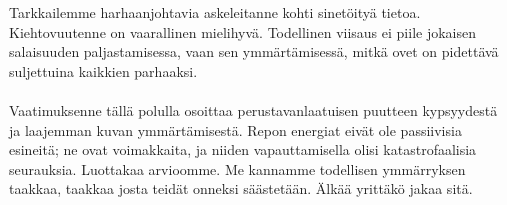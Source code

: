 \documentclass{article}
\begin{document}
\begin{infobox}
Tarkkailemme harhaanjohtavia askeleitanne kohti sinetöityä tietoa. Kiehtovuutenne on vaarallinen mielihyvä. Todellinen viisaus ei piile jokaisen salaisuuden paljastamisessa, vaan sen ymmärtämisessä, mitkä ovet on pidettävä suljettuina kaikkien parhaaksi.\\
\\
Vaatimuksenne tällä polulla osoittaa perustavanlaatuisen puutteen kypsyydestä ja laajemman kuvan ymmärtämisestä. Repon energiat eivät ole passiivisia esineitä; ne ovat voimakkaita, ja niiden vapauttamisella olisi katastrofaalisia seurauksia. Luottakaa arvioomme. Me kannamme todellisen ymmärryksen taakkaa, taakkaa josta teidät onneksi säästetään. Älkää yrittäkö jakaa sitä.
\end{infobox}
\end{document}

